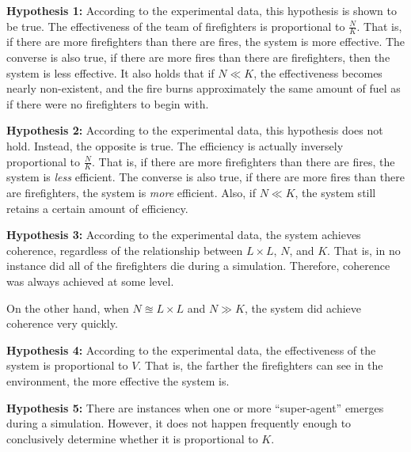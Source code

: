 \documentclass{article}
\begin{document}
  \begin{description}

    \item \textbf{Hypothesis 1:}
      According to the experimental data, this hypothesis is shown to be true.  The
      effectiveness of the team of firefighters is proportional to $\frac{N}{K}$.
      That is, if there are more firefighters than there are fires, the system
      is more effective.  The converse is also true, if there are more fires than
      there are firefighters, then the system is less effective.  It also holds
      that if $N \ll K$, the effectiveness becomes nearly non-existent, and the
      fire burns approximately the same amount of fuel as if there were no
      firefighters to begin with.

    \item \textbf{Hypothesis 2:}
      According to the experimental data, this hypothesis does not hold.  Instead, the
      opposite is true.  The efficiency is actually inversely proportional to
      $\frac{N}{K}$.  That is, if there are more firefighters than there are
      fires, the system is \textit{less} efficient.  The converse is also true, if
      there are more fires than there are firefighters, the system is \textit{more}
      efficient.  Also, if $N \ll K$, the system still retains a certain amount
      of efficiency.

    \item \textbf{Hypothesis 3:}
      According to the experimental data, the system achieves coherence,
      regardless of the relationship between $L \times L$, $N$, and $K$.
      That is, in no instance did all of the firefighters die during a
      simulation.  Therefore, coherence was always achieved at some level.

      On the other hand, when $N \approxeq L \times L$ and $N \gg K$,
      the system did achieve coherence very quickly.

    \item \textbf{Hypothesis 4:}
      According to the experimental data, the effectiveness of the system is
      proportional to $V$.  That is, the farther the firefighters can see in
      the environment, the more effective the system is.

    \item \textbf{Hypothesis 5:}
      There are instances when one or more ``super-agent'' emerges during a
      simulation.  However, it does not happen frequently enough to conclusively
      determine whether it is proportional to $K$.

  \end{description}
\end{document}
